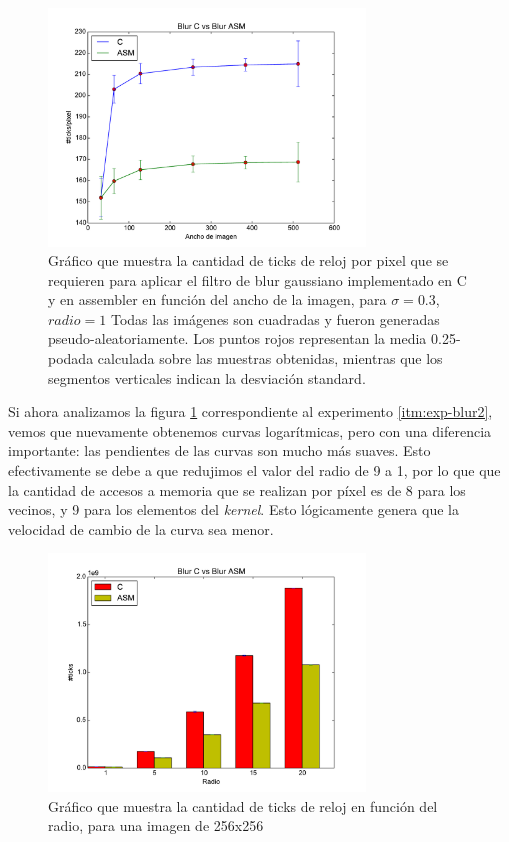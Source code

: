\begin{figure}[H]
 	\centering
 	\includegraphics[width=0.75\textwidth]{../graficos/blur_v2_lineplot_03-1.pdf}
	\caption{\footnotesize Gráfico que muestra la cantidad de ticks de reloj por pixel que se requieren para aplicar el filtro de blur gaussiano implementado en C y en assembler en función del ancho de la imagen, para $\sigma = 0.3$, $radio = 1$ Todas las imágenes son cuadradas y fueron generadas pseudo-aleatoriamente. Los puntos rojos representan la media 0.25-podada calculada sobre las muestras obtenidas, mientras que los segmentos verticales indican la desviación standard.}
	\label{fig:exp-blur2}
\end{figure}

Si ahora analizamos la figura \ref{fig:exp-blur2} correspondiente al experimento \ref{itm:exp-blur2}, vemos que nuevamente obtenemos curvas logarítmicas, pero con una diferencia importante: las pendientes de las curvas son mucho más suaves. Esto efectivamente se debe a que redujimos el valor del radio de 9 a 1, por lo que que la cantidad de accesos a memoria que se realizan por píxel es de 8 para los vecinos, y 9 para los elementos del \emph{kernel}. Esto lógicamente genera que la velocidad de cambio de la curva sea menor.

\begin{figure}[H]
 	\centering
 	\includegraphics[width=0.75\textwidth]{../graficos/barplot_radio.pdf}
	\caption{\footnotesize Gráfico que muestra la cantidad de ticks de reloj en función del radio, para una imagen de 256x256}
	\label{fig:exp-blur3}
\end{figure}

